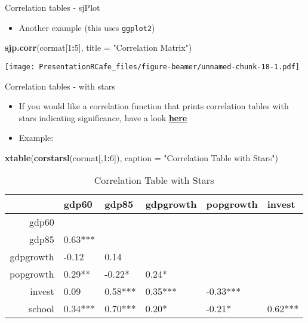 \documentclass[
  10pt,
  ignorenonframetext,
]{beamer}
\newenvironment{Shaded}{\begin{snugshade}}{\end{snugshade}}
\newcommand{\DataTypeTok}[1]{\textcolor[rgb]{0.13,0.29,0.53}{#1}}
\newcommand{\DecValTok}[1]{\textcolor[rgb]{0.00,0.00,0.81}{#1}}
\newcommand{\KeywordTok}[1]{\textcolor[rgb]{0.13,0.29,0.53}{\textbf{#1}}}
\newcommand{\NormalTok}[1]{#1}
\newcommand{\OperatorTok}[1]{\textcolor[rgb]{0.81,0.36,0.00}{\textbf{#1}}}
\newcommand{\StringTok}[1]{\textcolor[rgb]{0.31,0.60,0.02}{#1}}
\providecommand{\tightlist}{%
  \setlength{\itemsep}{0pt}\setlength{\parskip}{0pt}}
\begin{document}
\begin{frame}[fragile]{Correlation tables - sjPlot}
\protect\hypertarget{correlation-tables---sjplot-1}{}

\begin{itemize}
\tightlist
\item
  Another example (this uses \texttt{ggplot2}) \footnotesize
\end{itemize}

\begin{Shaded}
\begin{Highlighting}[]
\KeywordTok{sjp.corr}\NormalTok{(cormat[}\DecValTok{1}\OperatorTok{:}\DecValTok{5}\NormalTok{], }\DataTypeTok{title =} \StringTok{"Correlation Matrix"}\NormalTok{)}
\end{Highlighting}
\end{Shaded}

\texttt{[image: PresentationRCafe\_files/figure-beamer/unnamed-chunk-18-1.pdf]}
\normalsize

\end{frame}

\begin{frame}[fragile]{Correlation tables - with stars}
\protect\hypertarget{correlation-tables---with-stars}{}

\begin{itemize}
\item
  If you would like a correlation function that prints correlation
  tables with stars indicating significance, have a look
  \href{http://myowelt.blogspot.com/2008/04/beautiful-correlation-tables-in-r.html}{\textbf{here}}
\item
  Example:
\end{itemize}

\begin{Shaded}
\begin{Highlighting}[]
\KeywordTok{xtable}\NormalTok{(}\KeywordTok{corstarsl}\NormalTok{(cormat[,}\DecValTok{1}\OperatorTok{:}\DecValTok{6}\NormalTok{]), }
       \DataTypeTok{caption =} \StringTok{"Correlation Table with Stars"}\NormalTok{)}
\end{Highlighting}
\end{Shaded}

\begin{table}[ht]
\centering
\begin{tabular}{rlllll}
  \hline
 & gdp60 & gdp85 & gdpgrowth & popgrowth & invest \\ 
  \hline
gdp60 &  &  &  &  &  \\ 
  gdp85 &  0.63*** &  &  &  &  \\ 
  gdpgrowth & -0.12  &  0.14  &  &  &  \\ 
  popgrowth &  0.29**  & -0.22*  &  0.24*  &  &  \\ 
  invest &  0.09  &  0.58*** &  0.35*** & -0.33*** &  \\ 
  school &  0.34*** &  0.70*** &  0.20*  & -0.21*  &  0.62*** \\ 
   \hline
\end{tabular}
\caption{Correlation Table with Stars} 
\end{table}

\end{frame}
\end{document}
